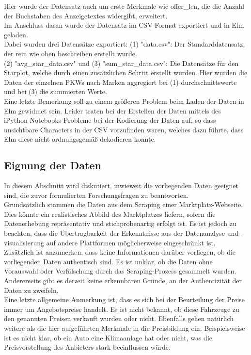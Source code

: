 Hier wurde der Datensatz auch um erste Merkmale wie offer_len, die die Anzahl der Buchstaben des Anzeigetextes widergibt, erweitert. \\

Im Anschluss daran wurde der Datensatz im CSV-Format exportiert und in Elm geladen. \\
Dabei wurden drei Datensätze exportiert: (1) "data.csv": Der Standarddatensatz, der rein wie oben beschreiben erstellt wurde. \\
(2) "avg_star_data.csv" und (3) "sum_star_data.csv": Die Datensätze für den Starplot, welche durch einen zusätzlichen Schritt erstellt wurden. Hier wurden die Daten der einzelnen PKWs nach Marken aggregiert bei (1) durchschnittswerte und bei (3) die summierten Werte.\\
Eine letzte Bemerkung soll zu einem größeren Problem beim Laden der Daten in Elm gewidmet sein. Leider traten bei der Erstellen der Daten mittels des iPython-Notebooks Probleme bei der Kodierung der Daten auf, so dass unsichtbare Characters in der CSV vorzufinden waren, welches dazu führte, dass Elm diese nicht ordnungsgemäß dekodieren konnte. \\

\subsection{Eignung der Daten}

In diesem Abschnitt wird diskutiert, inwieweit die vorliegenden Daten geeignet sind, die zuvor formulierten Forschungsfragen zu beantworten. \\

Grundsätzlich stammen die Daten aus dem Scraping einer Marktplatz-Webseite. Dies könnte ein realistisches Abbild des Marktplatzes liefern, sofern die Datenerhebung repräsentativ und stichprobenartig erfolgt ist. Es ist jedoch zu beachten, dass die Übertragbarkeit der Erkenntnisse aus der Datenanalyse und -visualisierung auf andere Plattformen möglicherweise eingeschränkt ist. \\

Zusätzlich ist anzumerken, dass keine Informationen darüber vorliegen, ob die vorliegenden Daten authentisch sind. Es ist unklar, ob die Daten ohne Vorauswahl oder Verfälschung durch das Scraping-Prozess gesammelt wurden. Andererseits gibt es derzeit keine erkennbaren Gründe, an der Authentizität der Daten zu zweifeln. \\

Eine letzte allgemeine Anmerkung ist, dass es sich bei der Beurteilung der Preise immer um Angebotspreise handelt. Es ist nicht bekannt, ob diese Fahrzeuge zu den genannten Preisen verkauft wurden oder nicht. Ebenfalls gehen natürlich weitere als die hier aufgeführten Merkmale in die Preisbildung ein. Beispielsweise ist es nicht klar, ob ein Auto eine Klimaanlage hat oder nicht, was die Preisvorstellung des Anbieters stark beeinflussen würde. \\

